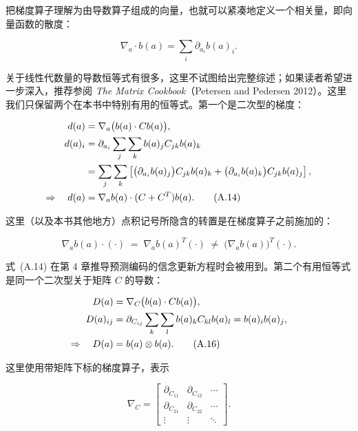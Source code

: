 把梯度算子理解为由导数算子组成的向量，也就可以紧凑地定义一个相关量，即向量函数的散度：

\begin{equation}
\nabla_a \cdot b(a) = \sum_i \partial_{a_i} b(a)_i.
\tag{A.13}
\end{equation}

关于线性代数量的导数恒等式有很多，这里不试图给出完整综述；如果读者希望进一步深入，推荐参阅 \emph{The Matrix Cookbook}（Petersen and Pedersen 2012）。这里我们只保留两个在本书中特别有用的恒等式。第一个是二次型的梯度：

\begin{align}
d(a) &= \nabla_a \bigl(b(a) \cdot C b(a)\bigr), \notag \\
d(a)_i
&= \partial_{a_i} \sum_j \sum_k b(a)_j C_{jk} b(a)_k \notag \\
&= \sum_j \sum_k
\left[
\bigl(\partial_{a_i} b(a)_j\bigr) C_{jk} b(a)_k
+
\bigl(\partial_{a_i} b(a)_k\bigr) C_{jk} b(a)_j
\right], \notag \\
\Rightarrow\quad
d(a)
&= \nabla_a b(a) \cdot (C + C^T) b(a).
\tag{A.14}
\end{align}

这里（以及本书其他地方）点积记号所隐含的转置是在梯度算子之前施加的：

\begin{equation}
\nabla_a b(a) \cdot (\cdot)
\;=\;
\nabla_a b(a)^T (\cdot)
\;\neq\;
\bigl(\nabla_a b(a)\bigr)^T (\cdot).
\tag{A.15}
\end{equation}

式~(A.14) 在第 4 章推导预测编码的信念更新方程时会被用到。第二个有用恒等式是同一个二次型关于矩阵 $C$ 的导数：

\begin{align}
D(a) &= \nabla_C \bigl(b(a) \cdot C b(a)\bigr), \notag \\
D(a)_{ij}
&= \partial_{C_{ij}} \sum_k \sum_l b(a)_k C_{kl} b(a)_l
= b(a)_i b(a)_j, \notag \\
\Rightarrow\quad
D(a) &= b(a) \otimes b(a).
\tag{A.16}
\end{align}

这里使用带矩阵下标的梯度算子，表示

\begin{equation}
\nabla_C =
\begin{bmatrix}
\partial_{C_{11}} & \partial_{C_{12}} & \cdots \\
\partial_{C_{21}} & \partial_{C_{22}} & \cdots \\
\vdots & \vdots & \ddots
\end{bmatrix}.
\tag{A.17}
\end{equation}

